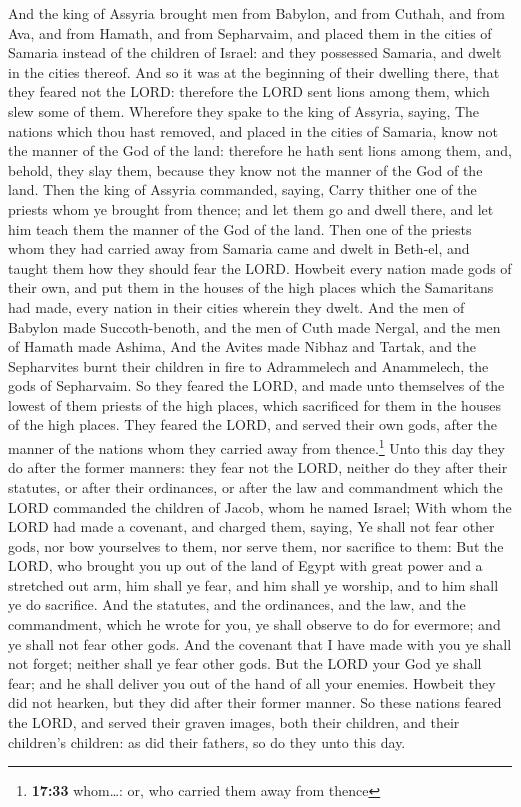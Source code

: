  And the king of Assyria brought men from Babylon, and
from Cuthah, and from Ava, and from Hamath, and from Sepharvaim, and
placed them in the cities of Samaria instead of the children of Israel:
and they possessed Samaria, and dwelt in the cities thereof.
 And so it was at the beginning of their dwelling there,
that they feared not the LORD: therefore the LORD sent lions among them,
which slew some of them.  Wherefore they spake to the
king of Assyria, saying, The nations which thou hast removed, and placed
in the cities of Samaria, know not the manner of the God of the land:
therefore he hath sent lions among them, and, behold, they slay them,
because they know not the manner of the God of the land. 
Then the king of Assyria commanded, saying, Carry thither one of the
priests whom ye brought from thence; and let them go and dwell there,
and let him teach them the manner of the God of the land.
 Then one of the priests whom they had carried away from
Samaria came and dwelt in Beth-el, and taught them how they should fear
the LORD.  Howbeit every nation made gods of their own,
and put them in the houses of the high places which the Samaritans had
made, every nation in their cities wherein they dwelt. 
And the men of Babylon made Succoth-benoth, and the men of Cuth made
Nergal, and the men of Hamath made Ashima,  And the
Avites made Nibhaz and Tartak, and the Sepharvites burnt their children
in fire to Adrammelech and Anammelech, the gods of Sepharvaim.
 So they feared the LORD, and made unto themselves of the
lowest of them priests of the high places, which sacrificed for them in
the houses of the high places.  They feared the LORD, and
served their own gods, after the manner of the nations whom they carried
away from thence.\footnote{\textbf{17:33} whom\ldots: or, who carried
  them away from thence}  Unto this day they do after the
former manners: they fear not the LORD, neither do they after their
statutes, or after their ordinances, or after the law and commandment
which the LORD commanded the children of Jacob, whom he named Israel;
 With whom the LORD had made a covenant, and charged
them, saying, Ye shall not fear other gods, nor bow yourselves to them,
nor serve them, nor sacrifice to them:  But the LORD, who
brought you up out of the land of Egypt with great power and a stretched
out arm, him shall ye fear, and him shall ye worship, and to him shall
ye do sacrifice.  And the statutes, and the ordinances,
and the law, and the commandment, which he wrote for you, ye shall
observe to do for evermore; and ye shall not fear other gods.
 And the covenant that I have made with you ye shall not
forget; neither shall ye fear other gods.  But the LORD
your God ye shall fear; and he shall deliver you out of the hand of all
your enemies.  Howbeit they did not hearken, but they did
after their former manner.  So these nations feared the
LORD, and served their graven images, both their children, and their
children's children: as did their fathers, so do they unto this day.

